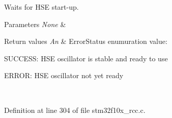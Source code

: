 Waits for H\+SE start-\/up. 


\begin{DoxyParams}{Parameters}
{\em None} & \\
\hline
\end{DoxyParams}

\begin{DoxyRetVals}{Return values}
{\em An} & Error\+Status enumuration value\+:
\begin{DoxyItemize}
\item S\+U\+C\+C\+E\+SS\+: H\+SE oscillator is stable and ready to use
\item E\+R\+R\+OR\+: H\+SE oscillator not yet ready 
\end{DoxyItemize}\\
\hline
\end{DoxyRetVals}


Definition at line 304 of file stm32f10x\+\_\+rcc.\+c.

